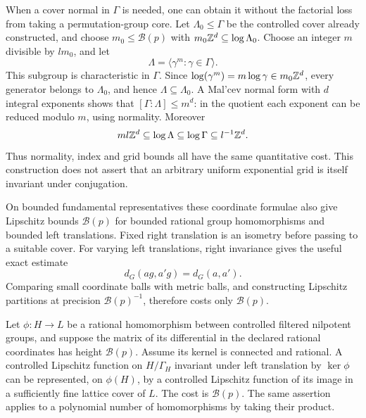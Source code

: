 When a cover normal in $\Gamma$ is needed, one can obtain it without
the factorial loss from taking a permutation-group core.  Let
$\Lambda_0\leq\Gamma$ be the controlled cover already constructed,
and choose $m_0\leq\mathcal B(p)$ with
$m_0\mathbb Z^d\subseteq\log\Lambda_0$.  Choose an integer $m$ divisible
by $lm_0$, and let
\[
 \Lambda=\langle\gamma^m:\gamma\in\Gamma\rangle.
\]
This subgroup is characteristic in $\Gamma$.  Since
$\log(\gamma^m)=m\log\gamma\in m_0\mathbb Z^d$, every generator
belongs to $\Lambda_0$, and hence $\Lambda\subseteq\Lambda_0$.
A Mal'cev normal form with $d$ integral exponents shows that
$[\Gamma:\Lambda]\leq m^d$: in the quotient each exponent can
be reduced modulo $m$, using normality.  Moreover
\[
 ml\mathbb Z^d\subseteq\log\Lambda
     \subseteq\log\Gamma\subseteq l^{-1}\mathbb Z^d.
\]
Thus normality, index and grid bounds all have the same quantitative
cost.  This construction does not assert that an arbitrary uniform
exponential grid is itself invariant under conjugation.

On bounded fundamental representatives these coordinate formulae
also give Lipschitz bounds $\mathcal B(p)$ for bounded rational group
homomorphisms and bounded left translations.  Fixed right translation
is an isometry before passing to a suitable cover.  For varying left
translations, right invariance gives the useful exact estimate
\[
 d_G(ag,a'g)=d_G(a,a').
\]
Comparing small coordinate balls with metric balls, and constructing
Lipschitz partitions at precision $\mathcal B(p)^{-1}$, therefore costs
only $\mathcal B(p)$.

\begin{lemma}
\label{prelim:reconstruction}
Let $\phi:H\to L$ be a rational homomorphism between controlled
filtered nilpotent groups, and suppose the matrix of its differential
in the declared rational coordinates has height $\mathcal B(p)$.
Assume its kernel is connected and rational.  A controlled
Lipschitz function on $H/\Gamma_H$ invariant under left translation by
$\ker\phi$ can be represented, on $\phi(H)$, by a controlled
Lipschitz function of its image in a sufficiently fine lattice cover
of $L$.  The cost is $\mathcal B(p)$.  The same assertion applies to
a polynomial number of homomorphisms by taking their product.
\end{lemma}


